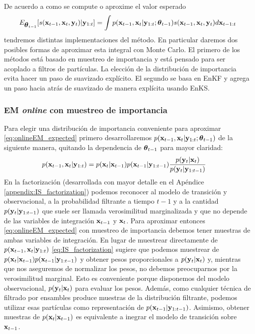 De acuerdo a como se compute o aproxime el valor esperado
\begin{align}
    E_{\mbox{\boldmath$ \theta $}_{t-1}} [s(\mathbf{x}_{t-1}, \mathbf{x}_t, \mathbf{y}_t) | \mathbf{y}_{1:t}] = \int p(\mathbf{x}_{t-1}, \mathbf{x}_t| \mathbf{y}_{1:t} ; \mbox{\boldmath$ \theta $}_{t-1}) s(\mathbf{x}_{t-1}, \mathbf{x}_t, \mathbf{y}_t) d\mathbf{x}_{t-1:t} \label{eq:onlineEM_expected}
\end{align}
tendremos distintas implementaciones del método. En particular daremos dos posibles formas de aproximar esta integral con Monte Carlo. El primero de los métodos está basado en muestreo de importancia y está pensado para ser acoplado a filtros de partículas. La elección de la distribución de importancia evita hacer un paso de suavizado explícito. El segundo se basa en EnKF y agrega un paso hacia atrás de suavizado de manera explícita usando EnKS. 

\subsubsection*{EM \textit{online} con muestreo de importancia} \label{sec:onlineEM_IS}

Para elegir una distribución de importancia conveniente para aproximar \ref{eq:onlineEM_expected} primero desarrollaremos $p(\mathbf{x}_{t-1}, \mathbf{x}_t| \mathbf{y}_{1:t}; \mbox{\boldmath$ \theta $}_{t-1})$ de la siguiente manera, quitando la dependencia de $\mbox{\boldmath$ \theta $}_{t-1}$ para mayor claridad:
\begin{align}
    p(\mathbf{x}_{t-1}, \mathbf{x}_t| \mathbf{y}_{1:t}) &= p(\mathbf{x}_t | \mathbf{x}_{t-1}) p(\mathbf{x}_{t-1} | \mathbf{y}_{1:t-1}) \frac{p(\mathbf{y}_t | \mathbf{x}_t)}{p(\mathbf{y}_t | \mathbf{y}_{1:t-1})} \label{eq:IS_factorization}
\end{align}
En la factorización (desarrollada con mayor detalle en el Apéndice \ref{appendix:IS_factorization}) podemos reconocer al modelo de transición y observacional, a la probabilidad filtrante a tiempo $t-1$ y a la cantidad $p(\mathbf{y}_t | \mathbf{y}_{1:t-1})$ que suele ser llamada verosimilitud marginalizada y que no depende de las variables de integración $\mathbf{x}_{t-1}$ y $\mathbf{x}_t$. Para aproximar entonces \ref{eq:onlineEM_expected} con muestreo de importancia debemos tener muestras de ambas variables de integración. En lugar de muestrear directamente de $p(\mathbf{x}_{t-1}, \mathbf{x}_t| \mathbf{y}_{1:t})$ \ref{eq:IS_factorization} sugiere que podemos muestrear de $p(\mathbf{x}_t | \mathbf{x}_{t-1}) p(\mathbf{x}_{t-1} | \mathbf{y}_{1:t-1})$ y obtener pesos proporcionales a $p(\mathbf{y}_t | \mathbf{x}_t)$ y, mientras que nos aseguremos de normalizar los pesos, no debemos preocuparnos por la verosimilitud marginal. Esto es conveniente porque disponemos del modelo observacional, $p(\mathbf{y}_t | \mathbf{x}_t)$ para evaluar los pesos. Además, como cualquier técnica de filtrado por ensambles produce muestras de la distribución filtrante, podemos utilizar esas partículas como representación de $p(\mathbf{x}_{t-1} | \mathbf{y}_{1:t-1})$. Asimismo, obtener muestras de $p(\mathbf{x}_{t} | \mathbf{x}_{t-1})$ es equivalente a inegrar el modelo de transición sobre $\mathbf{x}_{t-1}$.

